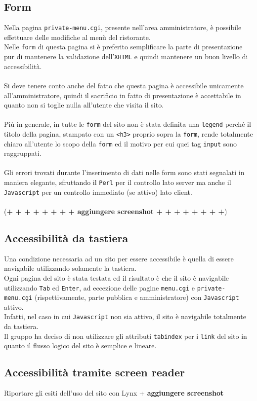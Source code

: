 \documentclass[../relazione.tex]{subfiles}
\begin{document}
	\subsection{Form}
		Nella pagina \texttt{private-menu.cgi}, presente nell'area amministratore, è possibile effettuare delle modifiche al menù del ristorante.\\
		Nelle \texttt{form} di questa pagina si è preferito semplificare la parte di presentazione pur di mantenere la validazione dell’\texttt{XHTML} e quindi mantenere un buon livello di accessibilità.\\\\
		Si deve tenere conto anche del fatto che questa pagina è accessibile unicamente all'amministratore, quindi il sacrificio in fatto di presentazione è accettabile in quanto non si toglie nulla all'utente che visita il sito.\\\\
		Più in generale, in tutte le \texttt{form} del sito non è stata definita una \texttt{legend} perché il titolo della pagina, stampato con un \texttt{<h3>} proprio sopra la \texttt{form}, rende totalmente chiaro all'utente lo scopo della \texttt{form} ed il motivo per cui quei tag \texttt{input} sono raggruppati.\\\\
		Gli errori trovati durante l'inserimento di dati nelle form sono stati segnalati in maniera elegante, sfruttando il \texttt{Perl} per il controllo lato server ma anche il \texttt{Javascript} per un controllo immediato (se attivo) lato client.\\\\
		(\textbf{+ + + + + + + + aggiungere screenshot + + + + + + + +})
	
	\subsection{Accessibilità da tastiera}
		Una condizione necessaria ad un sito per essere accessibile è quella di essere navigabile utilizzando solamente la tastiera.\\
		Ogni pagina del sito è stata testata ed il risultato è che il sito è navigabile utilizzando \texttt{Tab} ed \texttt{Enter}, ad eccezione delle pagine \texttt{menu.cgi} e \texttt{private-menu.cgi} (rispettivamente, parte pubblica e amministratore) con \texttt{Javascript} attivo.\\
		Infatti, nel caso in cui \texttt{Javascript} non sia attivo, il sito è navigabile totalmente da tastiera.\\
		Il gruppo ha deciso di non utilizzare gli attributi \texttt{tabindex} per i \texttt{link} del sito in quanto il flusso logico del sito è semplice e lineare.
	
	\subsection{Accessibilità tramite screen reader}
		Riportare gli esiti dell'uso del sito con Lynx + \textbf{aggiungere screenshot}
		
\end{document}
